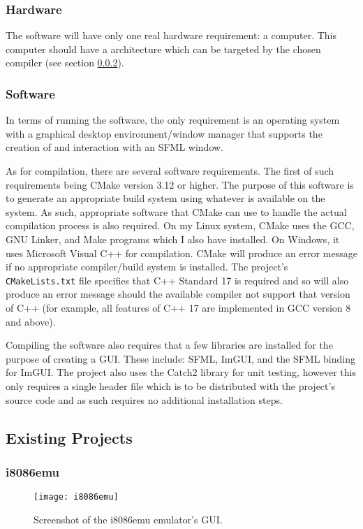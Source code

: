     \subsubsection{Hardware}
        The software will have only one real hardware requirement: a computer. This computer should have a architecture which can be targeted by the chosen compiler (see section \ref{sec:software-require}).

    \subsubsection{Software} \label{sec:software-require}
        In terms of running the software, the only requirement is an operating system with a graphical desktop environment/window manager that supports the creation of and interaction with an SFML window.

        As for compilation, there are several software requirements. The first of such requirements being CMake version 3.12 or higher. The purpose of this software is to generate an appropriate build system using whatever is available on the system. As such, appropriate software that CMake can use to handle the actual compilation process is also required. On my Linux system, CMake uses the GCC, GNU Linker, and Make programs which I also have installed. On Windows, it uses Microsoft Visual C++ for compilation. CMake will produce an error message if no appropriate compiler/build system is installed. The project's \texttt{CMakeLists.txt} file specifies that C++ Standard 17 is required and so will also produce an error message should the available compiler not support that version of C++ (for example, all features of C++ 17 are implemented in GCC version 8 and above).

        Compiling the software also requires that a few libraries are installed for the purpose of creating a GUI. These include: SFML, ImGUI, and the SFML binding for ImGUI. The project also uses the Catch2 library for unit testing, however this only requires a single header file which is to be distributed with the project's source code and as such requires no additional installation steps.

\subsection{Existing Projects}
    \subsubsection{i8086emu}
        \begin{figure}[h]
            \centering
            \texttt{[image: i8086emu]}
            \caption{Screenshot of the i8086emu emulator's GUI.}
            \label{fig:i8086emu}
        \end{figure}

